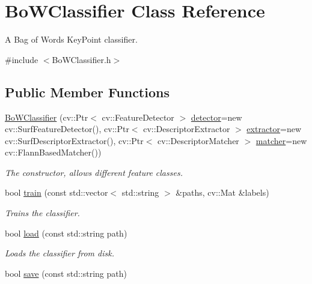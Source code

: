 \hypertarget{classBoWClassifier}{
\section{BoWClassifier Class Reference}
\label{classBoWClassifier}
}


A Bag of Words KeyPoint classifier.  




{\ttfamily \#include $<$BoWClassifier.h$>$}

\subsection*{Public Member Functions}
\begin{DoxyCompactItemize}
\item 
\hyperlink{classBoWClassifier_a2f0e69f7e1b1f5a5f4a1aa16fa584add}{BoWClassifier} (cv::Ptr$<$ cv::FeatureDetector $>$ \hyperlink{classBoWClassifier_a54b81ea8a299f93c88019a47ec271995}{detector}=new cv::SurfFeatureDetector(), cv::Ptr$<$ cv::DescriptorExtractor $>$ \hyperlink{classBoWClassifier_af4470ffa8f65afd086d5835806bee599}{extractor}=new cv::SurfDescriptorExtractor(), cv::Ptr$<$ cv::DescriptorMatcher $>$ \hyperlink{classBoWClassifier_a6308de14d1365161b0de07fd22ecb90d}{matcher}=new cv::FlannBasedMatcher())
\begin{DoxyCompactList}\small\item\em The constructor, allows different feature classes. \item\end{DoxyCompactList}\item 
bool \hyperlink{classBoWClassifier_a895b3766f5600533aa08632e42653dcb}{train} (const std::vector$<$ std::string $>$ \&paths, cv::Mat \&labels)
\begin{DoxyCompactList}\small\item\em Trains the classifier. \item\end{DoxyCompactList}\item 
bool \hyperlink{classBoWClassifier_a4c8902d5cca6991f9099a6486b124579}{load} (const std::string path)
\begin{DoxyCompactList}\small\item\em Loads the classifier from disk. \item\end{DoxyCompactList}\item 
bool \hyperlink{classBoWClassifier_ae563c9386e11fd8a171d28972d48dd16}{save} (const std::string path)

\end{DoxyCompactItemize}
